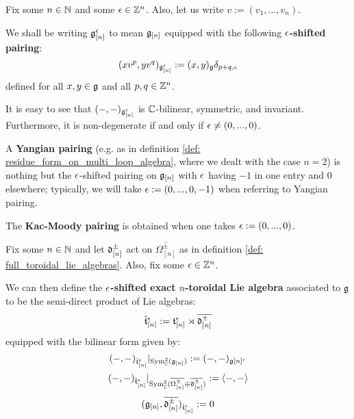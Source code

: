             \begin{definition} \label{def: shifted_pairings}
                Fix some $n \in \mathbb{N}$ and some $\epsilon \in \mathbb{Z}^n$. Also, let us write $v := (v_1, ..., v_n)$.

                We shall be writing $\mathfrak{g}_{[n]}^{\epsilon}$ to mean $\mathfrak{g}_{[n]}$ equipped with the following \textbf{$\epsilon$-shifted pairing}:
                    $$(x v^p, y v^q)_{\mathfrak{g}_{[n]}^{\epsilon}} := (x, y)_{\mathfrak{g}} \delta_{p + q, \epsilon}$$
                defined for all $x, y \in \mathfrak{g}$ and all $p, q \in \mathbb{Z}^n$. 
            \end{definition}
            \begin{remark}
                It is easy to see that $(-, -)_{\mathfrak{g}_{[n]}^{\epsilon}}$ is $\mathbb{C}$-bilinear, symmetric, and invariant. Furthermore, it is non-degenerate if and only if $\epsilon \not = (0, ..., 0)$.
            \end{remark}
            \begin{example}
                A \textbf{Yangian pairing} (e.g. as in definition \ref{def: residue_form_on_multi_loop_algebra}, where we dealt with the case $n = 2$) is nothing but the $\epsilon$-shifted pairing on $\mathfrak{g}_{[n]}$ with $\epsilon$ having $-1$ in one entry and $0$ elsewhere; typically, we will take $\epsilon := (0, ..., 0, -1)$ when referring to  Yangian pairing.
            \end{example}
            \begin{example}
                The \textbf{Kac-Moody pairing} is obtained when one takes $\epsilon := (0, ..., 0)$.
            \end{example}

            \begin{definition} \label{def: exact_toroidal_lie_algebras}
                Fix some $n \in \mathbb{N}$ and let $\mathfrak{d}_{[n]}^{\pm}$ act on $\overline{\Omega_{[n]}^{\pm}}$ as in definition \ref{def: full_toroidal_lie_algebras}. Also, fix some $\epsilon \in \mathbb{Z}^n$.

                We can then define the \textbf{$\epsilon$-shifted exact $n$-toroidal Lie algebra} associated to $\mathfrak{g}$ to be the semi-direct product of Lie algebras:
                    $$\hat{\mathfrak{t}}_{[n]}^{\epsilon} := \mathfrak{t}_{[n]}^{\epsilon} \rtimes \overline{\mathfrak{d}_{[n]}^{\pm}}$$
                equipped with the bilinear form given by:
                    $$(-, -)_{ \hat{\mathfrak{t}}_{[n]}^{\epsilon} }|_{ \mathrm{Sym}^2_{\mathbb{C}}( \mathfrak{g}_{[n]} ) } := (-, -)_{\mathfrak{g}[n]^{\epsilon}}$$
                    $$(-, -)_{ \hat{\mathfrak{t}}_{[n]}^{\epsilon} }|_{\mathrm{Sym}^2_{\mathbb{C}}( \overline{\Omega_{[n]}^{\pm}} \oplus \overline{\mathfrak{d}_{[n]}^{\pm}} )} := \langle-, -\rangle$$
                    $$( \mathfrak{g}_{[n]}, \overline{\mathfrak{d}_{[n]}^{\pm}} )_{ \hat{\mathfrak{t}}_{[n]}^{\epsilon} } := 0$$
            \end{definition}

